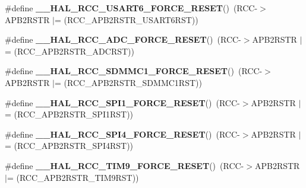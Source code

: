 \begin{DoxyCompactItemize}
\#define {\bfseries \+\_\+\+\_\+\+H\+A\+L\+\_\+\+R\+C\+C\+\_\+\+U\+S\+A\+R\+T6\+\_\+\+F\+O\+R\+C\+E\+\_\+\+R\+E\+S\+ET}()~(R\+CC-\/$>$A\+P\+B2\+R\+S\+TR $\vert$= (R\+C\+C\+\_\+\+A\+P\+B2\+R\+S\+T\+R\+\_\+\+U\+S\+A\+R\+T6\+R\+ST))
\item 
\mbox{\label{group___r_c_c_ex___force___release___peripheral___reset_ga915c2f73eef5fc0e95d76219280ef6c0}} 
\#define {\bfseries \+\_\+\+\_\+\+H\+A\+L\+\_\+\+R\+C\+C\+\_\+\+A\+D\+C\+\_\+\+F\+O\+R\+C\+E\+\_\+\+R\+E\+S\+ET}()~(R\+CC-\/$>$A\+P\+B2\+R\+S\+TR $\vert$= (R\+C\+C\+\_\+\+A\+P\+B2\+R\+S\+T\+R\+\_\+\+A\+D\+C\+R\+ST))
\item 
\mbox{\label{group___r_c_c_ex___force___release___peripheral___reset_gadb5820aecbb63af340610bab9370c544}} 
\#define {\bfseries \+\_\+\+\_\+\+H\+A\+L\+\_\+\+R\+C\+C\+\_\+\+S\+D\+M\+M\+C1\+\_\+\+F\+O\+R\+C\+E\+\_\+\+R\+E\+S\+ET}()~(R\+CC-\/$>$A\+P\+B2\+R\+S\+TR $\vert$= (R\+C\+C\+\_\+\+A\+P\+B2\+R\+S\+T\+R\+\_\+\+S\+D\+M\+M\+C1\+R\+ST))
\item 
\mbox{\label{group___r_c_c_ex___force___release___peripheral___reset_ga87e6bc588fa1d5ce3928d2fd2a3156a4}} 
\#define {\bfseries \+\_\+\+\_\+\+H\+A\+L\+\_\+\+R\+C\+C\+\_\+\+S\+P\+I1\+\_\+\+F\+O\+R\+C\+E\+\_\+\+R\+E\+S\+ET}()~(R\+CC-\/$>$A\+P\+B2\+R\+S\+TR $\vert$= (R\+C\+C\+\_\+\+A\+P\+B2\+R\+S\+T\+R\+\_\+\+S\+P\+I1\+R\+ST))
\item 
\mbox{\label{group___r_c_c_ex___force___release___peripheral___reset_ga79eef5116f30b60d64a7ef5bce8fca05}} 
\#define {\bfseries \+\_\+\+\_\+\+H\+A\+L\+\_\+\+R\+C\+C\+\_\+\+S\+P\+I4\+\_\+\+F\+O\+R\+C\+E\+\_\+\+R\+E\+S\+ET}()~(R\+CC-\/$>$A\+P\+B2\+R\+S\+TR $\vert$= (R\+C\+C\+\_\+\+A\+P\+B2\+R\+S\+T\+R\+\_\+\+S\+P\+I4\+R\+ST))
\item 
\mbox{\label{group___r_c_c_ex___force___release___peripheral___reset_ga9a62b264dec3df075dc7207993a9650e}} 
\#define {\bfseries \+\_\+\+\_\+\+H\+A\+L\+\_\+\+R\+C\+C\+\_\+\+T\+I\+M9\+\_\+\+F\+O\+R\+C\+E\+\_\+\+R\+E\+S\+ET}()~(R\+CC-\/$>$A\+P\+B2\+R\+S\+TR $\vert$= (R\+C\+C\+\_\+\+A\+P\+B2\+R\+S\+T\+R\+\_\+\+T\+I\+M9\+R\+ST))

\end{DoxyCompactItemize}
